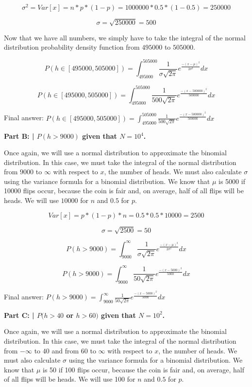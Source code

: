 \documentclass{article}
\begin{document}
 \[ \sigma^2 = Var[x] = n*p*(1-p) = 1000000*0.5*(1-0.5) = 250000 \]
 
 \[ \sigma = \sqrt{250000} = 500 \]
 
 Now that we have all numbers, we simply have to take the integral of the normal distribution probability density function from $495000$ to $505000$.
 
 \[ P(h \in [495000,505000]) = \int_{495000}^{505000}\frac{1}{\sigma\sqrt{2\pi}}e^\frac{-(x-\mu)^2}{2\sigma^2}dx\]
 
 \[ P(h \in [495000,505000]) = \int_{495000}^{505000}\frac{1}{500\sqrt{2\pi}}e^\frac{-(x-500000)^2}{500000}dx\]
 
 Final answer: $P(h \in [495000,505000]) = \int_{495000}^{505000}\frac{1}{500\sqrt{2\pi}}e^\frac{-(x-500000)^2}{500000}dx$\newline
 
 \textbf{Part B: | $P(h > 9000)$ given that $N=10^4$.}\newline
 
 Once again, we will use a normal distribution to approximate the binomial distribution. In this case, we must take the integral of the normal distribution from $9000$ to $\infty$ with respect to $x$, the number of heads. We must also calculate $\sigma$ using the variance formula for a binomial distribution. We know that $\mu$ is 5000 if 10000 flips occur, because the coin is fair and, on average, half of all flips will be heads. We will use $10000$ for $n$ and $0.5$ for $p$.
 
 \[Var[x] = p*(1-p)*n = 0.5*0.5*10000 = 2500\]
 
 \[\sigma = \sqrt{2500} = 50 \]
 
 \[ P(h > 9000) = \int_{9000}^{\infty}\frac{1}{\sigma\sqrt{2\pi}}e^\frac{-(x-\mu)^2}{2\sigma^2}dx\]
 
 \[ P(h > 9000) = \int_{9000}^{\infty}\frac{1}{50\sqrt{2\pi}}e^\frac{-(x-5000)^2}{5000}dx\]
 
 Final answer: $P(h > 9000) = \int_{9000}^{\infty}\frac{1}{50\sqrt{2\pi}}e^\frac{-(x-5000)^2}{5000}dx$\newline
 
 \textbf{Part C: | $P(h > 40 $ or $h > 60)$ given that $N=10^2$.}\newline
 
 Once again, we will use a normal distribution to approximate the binomial distribution. In this case, we must take the integral of the normal distribution from $-\infty$ to $40$ and from $60$ to $\infty$ with respect to $x$, the number of heads. We must also calculate $\sigma$ using the variance formula for a binomial distribution. We know that $\mu$ is 50 if 100 flips occur, because the coin is fair and, on average, half of all flips will be heads. We will use 100 for $n$ and $0.5$ for $p$.
 
\end{document}

